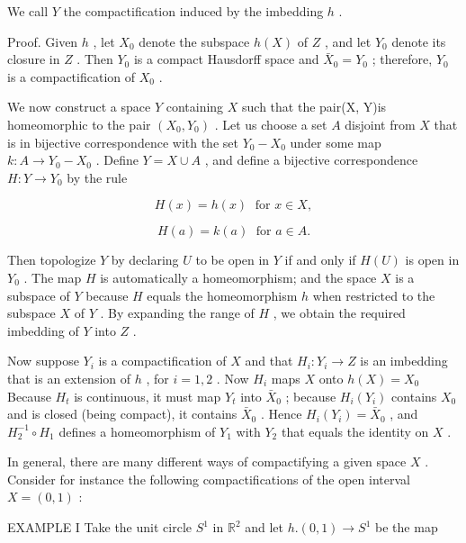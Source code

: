 We call \(Y\) the compactification induced by the imbedding \(h\) .

Proof. Given \(h\) , let \({X}_{0}\) denote the subspace \(h\left( X\right)\) of \(Z\) , and let \({Y}_{0}\) denote its closure in \(Z\) . Then \({Y}_{0}\) is a compact Hausdorff space and \({\bar{X}}_{0} = {Y}_{0}\) ; therefore, \({Y}_{0}\) is a compactification of \({X}_{0}\) .

We now construct a space \(Y\) containing \(X\) such that the pair(X, Y)is homeomorphic to the pair \(\left( {{X}_{0},{Y}_{0}}\right)\) . Let us choose a set \(A\) disjoint from \(X\) that is in bijective correspondence with the set \({Y}_{0} - {X}_{0}\) under some map \(k : A \rightarrow  {Y}_{0} - {X}_{0}\) . Define \(Y = X \cup  A\) , and define a bijective correspondence \(H : Y \rightarrow  {Y}_{0}\) by the rule

\[
H\left( x\right)  = h\left( x\right) \;\text{ for }x \in  X,
\]

\[
H\left( a\right)  = k\left( a\right) \;\text{ for }a \in  A.
\]

Then topologize \(Y\) by declaring \(U\) to be open in \(Y\) if and only if \(H\left( U\right)\) is open in \({Y}_{0}\) . The map \(H\) is automatically a homeomorphism; and the space \(X\) is a subspace of \(Y\) because \(H\) equals the homeomorphism \(h\) when restricted to the subspace \(X\) of \(Y\) . By expanding the range of \(H\) , we obtain the required imbedding of \(Y\) into \(Z\) .

Now suppose \({Y}_{i}\) is a compactification of \(X\) and that \({H}_{i} : {Y}_{i} \rightarrow  Z\) is an imbedding that is an extension of \(h\) , for \(i = 1,2\) . Now \({H}_{i}\) maps \(X\) onto \(h\left( X\right)  = {X}_{0}\) Because \({H}_{t}\) is continuous, it must map \({Y}_{t}\) into \({\bar{X}}_{0}\) ; because \({H}_{i}\left( {Y}_{i}\right)\) contains \({X}_{0}\) and is closed (being compact), it contains \({\bar{X}}_{0}\) . Hence \({H}_{i}\left( {Y}_{i}\right)  = {\bar{X}}_{0}\) , and \({H}_{2}^{-1} \circ  {H}_{1}\) defines a homeomorphism of \({Y}_{1}\) with \({Y}_{2}\) that equals the identity on \(X\) .

In general, there are many different ways of compactifying a given space \(X\) . Consider for instance the following compactifications of the open interval \(X = \left( {0,1}\right)\) :

EXAMPLE I Take the unit circle \({S}^{1}\) in \({\mathbb{R}}^{2}\) and let \(h.\left( {0,1}\right)  \rightarrow  {S}^{1}\) be the map


